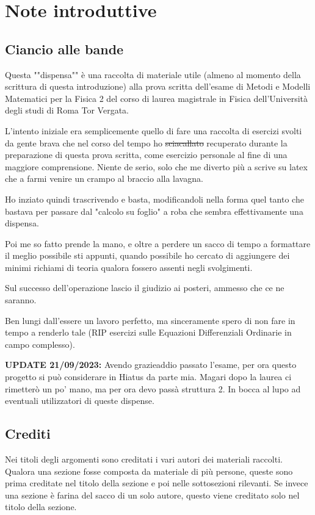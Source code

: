 \chapter{Note introduttive}

\section{Ciancio alle bande}

Questa ""dispensa"" è una raccolta di materiale utile (almeno al momento della scrittura di questa introduzione) alla prova scritta dell'esame  di Metodi e Modelli Matematici per la Fisica 2 del corso di laurea magistrale in Fisica dell'Università degli studi di Roma Tor Vergata. 

L'intento iniziale era semplicemente quello di fare una raccolta di esercizi svolti da gente brava che nel corso del tempo ho \st{sciacallato} recuperato durante la preparazione di questa prova scritta, come esercizio personale al fine di una maggiore comprensione. Niente de serio, solo che me diverto più a scrive su latex che a farmi venire un crampo al braccio alla lavagna.

Ho inziato quindi trascrivendo e basta, modificandoli nella forma quel tanto che bastava per passare dal "calcolo su foglio" a roba che sembra effettivamente una dispensa. 

Poi me so fatto prende la mano, e oltre a perdere un sacco di tempo a formattare il meglio possibile sti appunti, quando possibile ho cercato di aggiungere dei minimi richiami di teoria qualora fossero assenti negli svolgimenti.

Sul successo dell'operazione lascio il giudizio ai posteri, ammesso che ce ne saranno.


Ben lungi dall'essere un lavoro perfetto, ma sinceramente spero di non fare in tempo a renderlo tale (RIP esercizi sulle Equazioni Differenziali Ordinarie in campo complesso).

\textbf{UPDATE 21/09/2023:} Avendo grazieaddio passato l'esame, per ora questo progetto si può considerare in Hiatus da parte mia. Magari dopo la laurea ci rimetterò un po' mano, ma per ora devo passà struttura 2. In bocca al lupo ad eventuali utilizzatori di queste dispense.

\section{Crediti}

Nei titoli degli argomenti sono creditati i vari autori dei materiali raccolti. Qualora una sezione fosse composta da materiale di più persone, queste sono prima creditate nel titolo della sezione e poi nelle sottosezioni rilevanti. Se invece una sezione è farina del sacco di un solo autore, questo viene creditato solo nel titolo della sezione.

